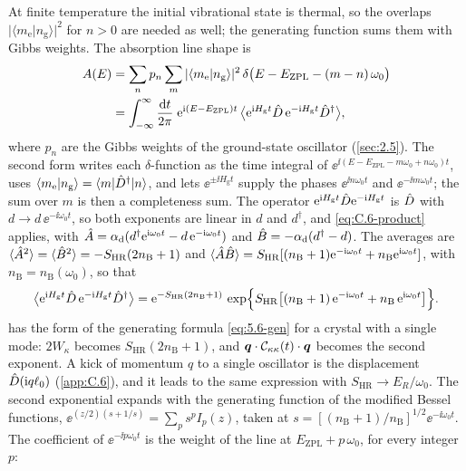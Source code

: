 At finite temperature the initial vibrational state is thermal, so the overlaps $|\langle m_{\mathrm{e}}|n_{\mathrm{g}}\rangle|^2$ for $n > 0$ are needed as well; the generating function sums them with Gibbs weights. The absorption line shape is
\begin{equation*}
  \begin{aligned}
  A(E) &= \sum_np_n\sum_m|\langle m_{\mathrm{e}}|n_{\mathrm{g}}\rangle|^2\,\delta\bigl(E - E_{\mathrm{ZPL}} - (m - n)\,\omega_0\bigr) \\
  &= \int_{-\infty}^{\infty}\frac{\mathrm{d} t}{2\pi}\;\mathrm{e}^{\mathrm{i}(E - E_{\mathrm{ZPL}})t}\,\bigl\langle\mathrm{e}^{\mathrm{i} H_{\mathrm{g}}t}\hat{D}\,\mathrm{e}^{-\mathrm{i} H_{\mathrm{g}}t}\hat{D}^\dagger\bigr\rangle ,
  \end{aligned}
\end{equation*}
where $p_n$ are the Gibbs weights of the ground-state oscillator (\cref{sec:2.5}). The second form writes each $\delta$-function as the time integral of $\ee^{\ii(E - E_{\mathrm{ZPL}} - m\omega_0 + n\omega_0)t}$, uses $\langle m_{\mathrm{e}}|n_{\mathrm{g}}\rangle = \langle m|\hat{D}^\dagger|n\rangle$, and lets $\ee^{\pm\ii H_{\mathrm{g}}t}$ supply the phases $\ee^{\ii n\omega_0t}$ and $\ee^{-\ii m\omega_0t}$; the sum over $m$ is then a completeness sum. The operator $\mathrm{e}^{\mathrm{i} H_{\mathrm{g}}t}\hat{D}\mathrm{e}^{-\mathrm{i} H_{\mathrm{g}}t}$ is $\hat{D}$ with $d \to d\,\ee^{-\ii\omega_0t}$, so both exponents are linear in $d$ and $d^\dagger$, and \cref{eq:C.6-product} applies, with $\hat{A} = \alpha_{\mathrm{d}}(d^\dagger\mathrm{e}^{\mathrm{i}\omega_0t} - d\,\mathrm{e}^{-\mathrm{i}\omega_0t})$ and $\hat{B} = -\alpha_{\mathrm{d}}(d^\dagger - d)$. The averages are $\langle\hat{A}^2\rangle = \langle\hat{B}^2\rangle = -S_{\mathrm{HR}}(2n_{\mathrm{B}} + 1)$ and $\langle\hat{A}\hat{B}\rangle = S_{\mathrm{HR}}[(n_{\mathrm{B}} + 1)\mathrm{e}^{-\mathrm{i}\omega_0t} + n_{\mathrm{B}}\mathrm{e}^{\mathrm{i}\omega_0t}]$, with $n_{\mathrm{B}} = n_{\mathrm{B}}(\omega_0)$, so that
\begin{equation}
  \bigl\langle\mathrm{e}^{\mathrm{i} H_{\mathrm{g}}t}\hat{D}\,\mathrm{e}^{-\mathrm{i} H_{\mathrm{g}}t}\hat{D}^\dagger\bigr\rangle
  = \mathrm{e}^{-S_{\mathrm{HR}}(2n_{\mathrm{B}} + 1)}\,\exp\Bigl\{S_{\mathrm{HR}}\bigl[(n_{\mathrm{B}} + 1)\,\mathrm{e}^{-\mathrm{i}\omega_0t} + n_{\mathrm{B}}\,\mathrm{e}^{\mathrm{i}\omega_0t}\bigr]\Bigr\} .
  \label{eq:5.6-Gt}
\end{equation}
 has the form of the generating formula \cref{eq:5.6-gen} for a crystal with a single mode: $2W_\kappa$ becomes $S_{\mathrm{HR}}(2n_{\mathrm{B}} + 1)$, and $\bm{q}\cdot\mathcal{C}_{\kappa\kappa}(t)\cdot\bm{q}$ becomes the second exponent. A kick of momentum $q$ to a single oscillator is the displacement $\hat{D}(\mathrm{i} q\ell_0)$ (\cref{app:C.6}), and it leads to the same expression with $S_{\mathrm{HR}} \to E_R/\omega_0$. The second exponential expands with the generating function of the modified Bessel functions, $\ee^{(z/2)(s + 1/s)} = \sum_ps^pI_p(z)$, taken at $s = [(n_{\mathrm{B}} + 1)/n_{\mathrm{B}}]^{1/2}\ee^{-\ii\omega_0t}$. The coefficient of $\ee^{-\ii p\omega_0t}$ is the weight of the line at $E_{\mathrm{ZPL}} + p\,\omega_0$, for every integer $p$:
